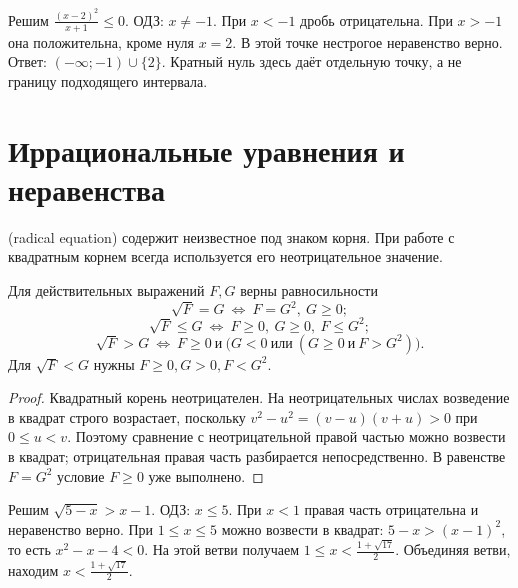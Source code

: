 \ifdim\dimexpr\ht\CatFlowBox+\dp\CatFlowBox\relax<58mm\dp\CatFlowBox=\dimexpr58mm-\ht\CatFlowBox\relax\fi%
\noindent\usebox{\CatFlowBox}\par\addvspace{2pt}
\begin{example}Решим \(\frac{(x-2)^2}{x+1}\leq0\). ОДЗ: \(x\ne-1\). При \(x<-1\) дробь отрицательна. При \(x>-1\) она положительна, кроме нуля \(x=2\). В этой точке нестрогое неравенство верно. Ответ: \(( -\infty;-1)\cup\{2\}\). Кратный нуль здесь даёт отдельную точку, а не границу подходящего интервала.\end{example}

\section{Иррациональные уравнения и неравенства}
\begin{definition} (radical equation) содержит неизвестное под знаком корня. При работе с квадратным корнем всегда используется его неотрицательное значение.\end{definition}
\begin{theorem}
Для действительных выражений \(F,G\) верны равносильности
\[
\sqrt F=G\ \Longleftrightarrow\ F=G^2,\ G\geq0;
\]
\[
\sqrt F\leq G\ \Longleftrightarrow\ F\geq0,\ G\geq0,\ F\leq G^2;
\]
\[
\sqrt F>G\ \Longleftrightarrow\ F\geq0\ \text{и}\
\bigl(G<0\ \text{или}\ (G\geq0\ \text{и}\ F>G^2)\bigr).
\]
Для \(\sqrt F<G\) нужны \(F\geq0,G>0,F<G^2\).
\end{theorem}
\begin{proof}Квадратный корень неотрицателен. На неотрицательных числах возведение в квадрат строго возрастает, поскольку \(v^2-u^2=(v-u)(v+u)>0\) при \(0\leq u<v\). Поэтому сравнение с неотрицательной правой частью можно возвести в квадрат; отрицательная правая часть разбирается непосредственно. В равенстве \(F=G^2\) условие \(F\geq0\) уже выполнено.\end{proof}
\begin{example}Решим \(\sqrt{5-x}>x-1\). ОДЗ: \(x\leq5\). При \(x<1\) правая часть отрицательна и неравенство верно. При \(1\leq x\leq5\) можно возвести в квадрат: \(5-x>(x-1)^2\), то есть \(x^2-x-4<0\). На этой ветви получаем \(1\leq x<\frac{1+\sqrt{17}}2\). Объединяя ветви, находим \(x<\frac{1+\sqrt{17}}2\).\end{example}

